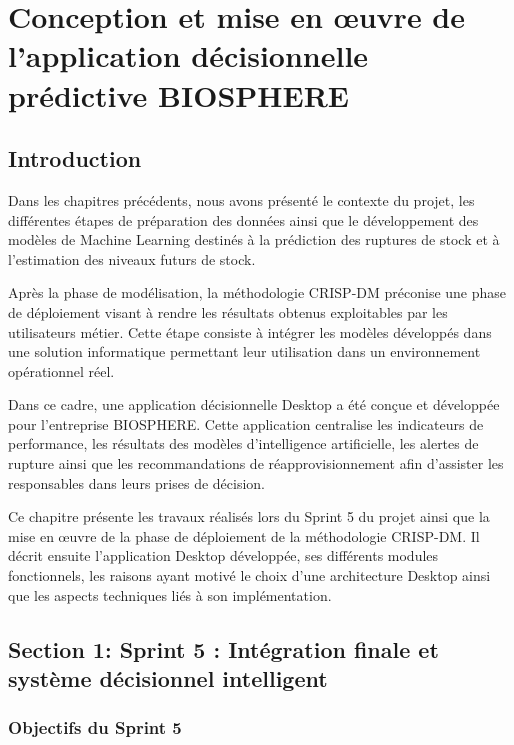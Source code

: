 ﻿\newpage
\pagestyle{fancy}
\renewcommand{\headrulewidth}{0.5pt}
\renewcommand{\footrulewidth}{0.5pt}

\chapter{Conception et mise en œuvre de l'application décisionnelle prédictive BIOSPHERE}\setlength{\headheight}{28pt}
\label{ch5}
\minitoc
\newpage

\section{Introduction}

Dans les chapitres précédents, nous avons présenté le contexte du projet, les différentes étapes de préparation des données ainsi que le développement des modèles de Machine Learning destinés à la prédiction des ruptures de stock et à l'estimation des niveaux futurs de stock.

Après la phase de modélisation, la méthodologie CRISP-DM préconise une phase de déploiement visant à rendre les résultats obtenus exploitables par les utilisateurs métier. Cette étape consiste à intégrer les modèles développés dans une solution informatique permettant leur utilisation dans un environnement opérationnel réel.

Dans ce cadre, une application décisionnelle Desktop a été conçue et développée pour l'entreprise BIOSPHERE. Cette application centralise les indicateurs de performance, les résultats des modèles d'intelligence artificielle, les alertes de rupture ainsi que les recommandations de réapprovisionnement afin d'assister les responsables dans leurs prises de décision.

Ce chapitre présente les travaux réalisés lors du Sprint 5 du projet ainsi que la mise en œuvre de la phase de déploiement de la méthodologie CRISP-DM. Il décrit ensuite l'application Desktop développée, ses différents modules fonctionnels, les raisons ayant motivé le choix d'une architecture Desktop ainsi que les aspects techniques liés à son implémentation.

\section{Section 1: Sprint 5 : Intégration finale et système décisionnel intelligent}

\subsection{Objectifs du Sprint 5}

